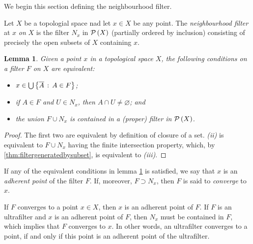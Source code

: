 \theoremstyle{plain}
\newtheorem{thmBoolPowsetIso}{Proposition}[section]
\newtheorem{lemmaFilterConverges}[thmBoolPowsetIso]{Lemma}
\newtheorem{coroTopoConseq}[thmBoolPowsetIso]{Corollary}
\newtheorem{lemmaCharAlg}[thmBoolPowsetIso]{Lemma}
\newtheorem{thmStoneSpaceOfBoolIsStoneSpace}[thmBoolPowsetIso]{Theorem}
\newtheorem{thmStoneSpaceIsStoneSpaceOfBool}[thmBoolPowsetIso]{Theorem}

\theoremstyle{remark}



We begin this section defining the neighbourhood filter.

Let $X$ be a topologial space nad let $x\in X$ be any point. The
\emph{neighbourhood filter} at $x$ \emph{on} $X$ is the filter
$N_{x}$ in $\mathcal{P}\left(X\right)$ (partially ordered by inclusion) consisting of
precisely the open subsets of $X$ containing $x$.

\begin{lemmaFilterConverges}\label{thm:filterconverges}
	Given a point $x$ in a topological space $X$, the following conditions
	on a filter $F$ on $X$ are equivalent:
	\begin{itemize}
		\item[i]
			\begin{math}
				x\in\bigcup\left\lbrace\overline{A}
				\,:\,A\in F\right\rbrace
			\end{math};
		\item[ii] if $A\in F$ and $U\in N_{x}$, then
			$A\cap U\not=\varnothing$; and
		\item[iii] the union $F\cup N_{x}$ is contained in a (proper)
			filter in $\mathcal{P}\left(X\right)$.
	\end{itemize}
\end{lemmaFilterConverges}

\begin{proof}
	The first two are equivalent by definition of closure of a set.
	\textit{(ii)} is equivalent to $F\cup N_{x}$ having the finite
	intersection property, which, by \ref{thm:filtergeneratedbysubset},
	is equivalent to \textit{(iii)}.
\end{proof}

If any of the equivalent conditions in lemma \ref{thm:filterconverges}
is satisfied, we say that $x$ is an \emph{adherent point} of the filter
$F$. If, moreover, $F\supset N_{x}$, then $F$ is said to \emph{converge}
to $x$.

If $F$ converges to a point $x\in X$, then $x$ is an adherent
point of $F$. If $F$ is an ultrafilter and $x$ is an adherent point of
$F$, then $N_{x}$ must be contained in $F$, which implies that $F$
converges to $x$. In other words, an ultrafilter converges to a point, if
and only if this point is an adherent point of the ultrafilter.

